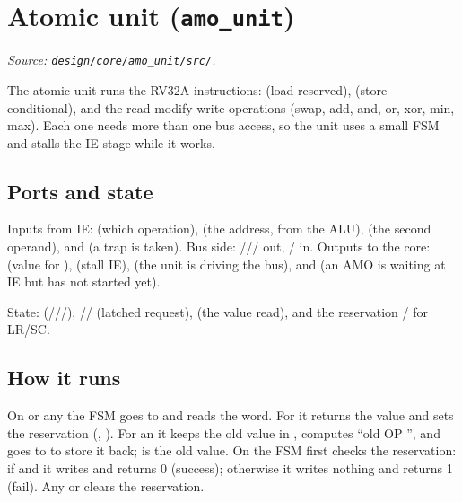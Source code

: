 \section{Atomic unit (\texttt{amo\_unit})}
\textit{Source: \texttt{design/core/amo\_unit/src/}.}

The atomic unit runs the RV32A instructions:  (load-reserved),
 (store-conditional), and the  read-modify-write
operations (swap, add, and, or, xor, min, max). Each one needs more than one bus
access, so the unit uses a small FSM and stalls the IE stage while it works.


\subsection{Ports and state}
Inputs from IE:  (which operation),  (the address,
from the ALU),  (the second operand), and  (a trap is
taken). Bus side: ///
 out, / in.
Outputs to the core:  (value for ),  (stall
IE),  (the unit is driving the bus), and  (an AMO
is waiting at IE but has not started yet).

State:  (///),
// (latched request),  (the
value read), and the reservation / for LR/SC.

\subsection{How it runs}
On  or any  the FSM goes to  and reads the
word. For  it returns the value and sets the reservation
(, ). For an  it keeps the old value
in , computes ``old OP '', and goes to
 to store it back;  is the old value. On 
the FSM first checks the reservation: if  and  it writes and returns 0 (success); otherwise it writes nothing and
returns 1 (fail). Any  or  clears the reservation.

